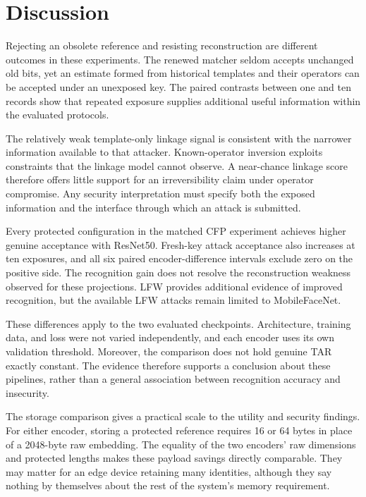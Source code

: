 \section{Discussion}\label{sec:discussion}


Rejecting an obsolete reference and resisting reconstruction are different outcomes in these experiments. The renewed matcher seldom accepts unchanged old bits, yet an estimate formed from historical templates and their operators can be accepted under an unexposed key. The paired contrasts between one and ten records show that repeated exposure supplies additional useful information within the evaluated protocols.

The relatively weak template-only linkage signal is consistent with the narrower information available to that attacker. Known-operator inversion exploits constraints that the linkage model cannot observe. A near-chance linkage score therefore offers little support for an irreversibility claim under operator compromise. Any security interpretation must specify both the exposed information and the interface through which an attack is submitted.


Every protected configuration in the matched CFP experiment achieves higher genuine acceptance with ResNet50. Fresh-key attack acceptance also increases at ten exposures, and all six paired encoder-difference intervals exclude zero on the positive side. The recognition gain does not resolve the reconstruction weakness observed for these projections. LFW provides additional evidence of improved recognition, but the available LFW attacks remain limited to MobileFaceNet.

These differences apply to the two evaluated checkpoints. Architecture, training data, and loss were not varied independently, and each encoder uses its own validation threshold. Moreover, the comparison does not hold genuine TAR exactly constant. The evidence therefore supports a conclusion about these pipelines, rather than a general association between recognition accuracy and insecurity.


The storage comparison gives a practical scale to the utility and security findings. For either encoder, storing a protected reference requires 16 or 64 bytes in place of a 2048-byte raw embedding. The equality of the two encoders' raw dimensions and protected lengths makes these payload savings directly comparable. They may matter for an edge device retaining many identities, although they say nothing by themselves about the rest of the system's memory requirement.

